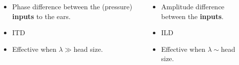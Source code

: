 \documentclass{beamer}
\begin{document}
\begin{frame}[t]
\begin{exampleblock}
{    \begin{columns}
 
    \begin{column}{0.5\textwidth}
    \small
     \begin{itemize}
    \item[] Phase difference between the (pressure) \textbf{inputs} to the ears.
    \item ITD
    \item Effective when $\lambda\gg$head size.
     \end{itemize}
    \end{column}
     
    \begin{column}{0.5\textwidth}
    \small
     \begin{itemize}
          \item[] Amplitude difference between the \textbf{inputs}.
          \item ILD
          \item Effective when $\lambda\sim$head size.
     \end{itemize}
    \end{column}
    

\end{columns}}
\end{exampleblock}
\end{frame}
\end{document}
